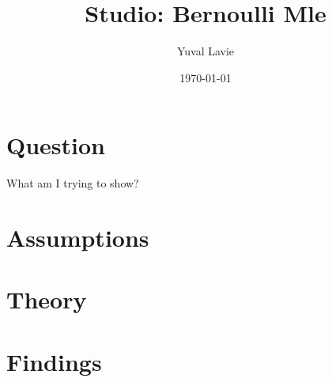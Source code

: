 \documentclass[11pt]{article}
\title{Studio: Bernoulli Mle}
\author{Yuval Lavie}
\date{\today}
\begin{document}
\maketitle

\section{Question}

What am I trying to show?

\section{Assumptions}

\section{Theory}


\section{Findings}

\end{document}
